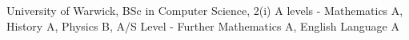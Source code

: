%
%
%


\begin{scholarship}
					{University of Warwick, BSc in Computer Science, 2(i)}
					{A levels - Mathematics A, History A, Physics B, A/S Level - Further Mathematics A, English Language A}
\end{scholarship}